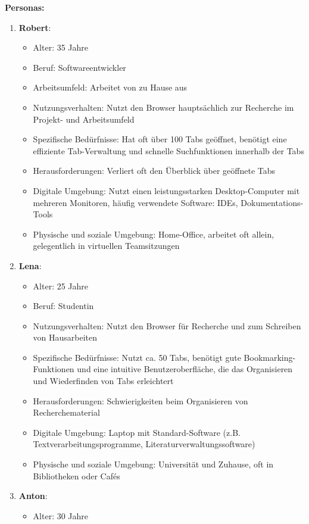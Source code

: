 \textbf{Personas:}
\begin{enumerate}
    \item \textbf{Robert}:
    \begin{itemize}
        \item Alter: 35 Jahre
        \item Beruf: Softwareentwickler
        \item Arbeitsumfeld: Arbeitet von zu Hause aus
        \item Nutzungsverhalten: Nutzt den Browser hauptsächlich zur Recherche im Projekt- und Arbeitsumfeld
        \item Spezifische Bedürfnisse: Hat oft über 100 Tabs geöffnet, benötigt eine effiziente Tab-Verwaltung und schnelle Suchfunktionen innerhalb der Tabs
        \item Herausforderungen: Verliert oft den Überblick über geöffnete Tabs
        \item Digitale Umgebung: Nutzt einen leistungsstarken Desktop-Computer mit mehreren Monitoren, häufig verwendete Software: IDEs, Dokumentations-Tools
        \item Physische und soziale Umgebung: Home-Office, arbeitet oft allein, gelegentlich in virtuellen Teamsitzungen
    \end{itemize}
    \item \textbf{Lena}:
    \begin{itemize}
        \item Alter: 25 Jahre
        \item Beruf: Studentin
        \item Nutzungsverhalten: Nutzt den Browser für Recherche und zum Schreiben von Hausarbeiten
        \item Spezifische Bedürfnisse: Nutzt ca. 50 Tabs, benötigt gute Bookmarking-Funktionen und eine intuitive Benutzeroberfläche, die das Organisieren und Wiederfinden von Tabs erleichtert
        \item Herausforderungen: Schwierigkeiten beim Organisieren von Recherchematerial
        \item Digitale Umgebung: Laptop mit Standard-Software (z.B. Textverarbeitungsprogramme, Literaturverwaltungssoftware)
        \item Physische und soziale Umgebung: Universität und Zuhause, oft in Bibliotheken oder Cafés
    \end{itemize}
    \item \textbf{Anton}:
    \begin{itemize}
        \item Alter: 30 Jahre

\end{itemize}
\end{enumerate}
